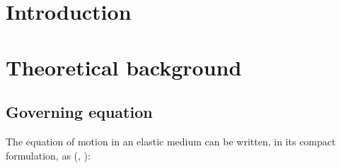 \documentclass{gnulike}
\begin{document}



\tableofcontents
\thispagestyle{empty}
\clearpage\newpage


\chapter{Introduction}

\chapter{Theoretical background}

\section{Governing equation}

\noindent The equation of motion in an elastic medium can be written, in its compact formulation, as (\cite{aki2002quantitative}, \cite{virieux2016modelling}):
\end{document}
